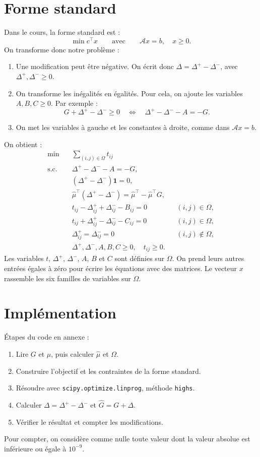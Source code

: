 \documentclass[11pt,a4paper]{article}
\begin{document}
\section{Forme standard}
Dans le cours, la forme standard est :
\[
 \min c^\top x \qquad\text{avec}\qquad \mathcal A x=b,\quad x\geq0.
\]
On transforme donc notre problème :
\begin{enumerate}
 \item Une modification peut être négative. On écrit donc
 \(\Delta=\Delta^+-\Delta^-\), avec \(\Delta^+,\Delta^-\geq0\).
 \item On transforme les inégalités en égalités. Pour cela, on ajoute
 les variables \(A,B,C\geq0\). Par exemple :
 \[
 G+\Delta^+-\Delta^-\geq0
 \quad\Longleftrightarrow\quad
 \Delta^+-\Delta^--A=-G.
 \]
 \item On met les variables à gauche et les constantes à droite,
 comme dans \(\mathcal A x=b\).
\end{enumerate}
On obtient :
\begin{align*}
 \min\quad &\sum_{(i,j)\in\Omega}t_{ij}\\
 \text{s.c.}\quad
 &\Delta^+-\Delta^--A=-G,\\
 &(\Delta^+-\Delta^-)\mathbf 1=0,\\
 &\widehat\mu^\top(\Delta^+-\Delta^-)=\widehat\mu^\top-\widehat\mu^\top G,\\
 &t_{ij}-\Delta^+_{ij}+\Delta^-_{ij}-B_{ij}=0
 &&(i,j)\in\Omega,\\
 &t_{ij}+\Delta^+_{ij}-\Delta^-_{ij}-C_{ij}=0
 &&(i,j)\in\Omega,\\
 &\Delta^+_{ij}=\Delta^-_{ij}=0 &&(i,j)\notin\Omega,\\
 &\Delta^+,\Delta^-,A,B,C\geq0,\quad t_{ij}\geq0.
\end{align*}
Les variables \(t\), \(\Delta^+\), \(\Delta^-\), \(A\), \(B\) et \(C\)
sont définies sur \(\Omega\). On prend leurs autres entrées égales à zéro
pour écrire les équations avec des matrices. Le vecteur \(x\) rassemble
les six familles de variables sur \(\Omega\).

\section{Implémentation}
Étapes du code en annexe :
\begin{enumerate}
 \item Lire \(G\) et \(\mu\), puis calculer \(\widehat\mu\) et \(\Omega\).
 \item Construire l'objectif et les contraintes de la forme standard.
 \item Résoudre avec \texttt{scipy.optimize.linprog}, méthode \texttt{highs}.
 \item Calculer \(\Delta=\Delta^+-\Delta^-\) et \(\widehat G=G+\Delta\).
 \item Vérifier le résultat et compter les modifications.
\end{enumerate}
Pour compter, on considère comme nulle toute valeur dont la valeur
absolue est inférieure ou égale à \(10^{-9}\).
\end{document}
